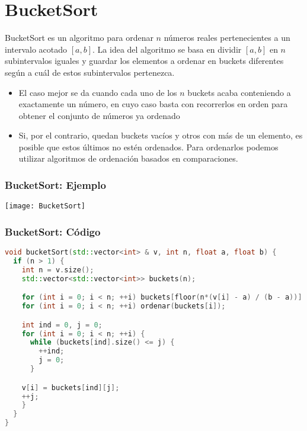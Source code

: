 \documentclass{beamer}
\begin{document}
\section{BucketSort}
\begin{frame}
 \alert{BucketSort} es un algoritmo para ordenar $n$ números reales pertenecientes a un intervalo acotado $[a,b]$.
 La idea del algoritmo se basa en dividir $[a,b]$ en $n$ subintervalos iguales y guardar los elementos a ordenar en \alert{buckets} diferentes según a cuál de estos subintervalos pertenezca.
 \begin{itemize}
 	\item El caso mejor se da cuando cada uno de los $n$ buckets acaba conteniendo a exactamente un número, en cuyo caso basta con recorrerlos en orden para obtener el conjunto de números ya ordenado
 	\item Si, por el contrario, quedan buckets vacíos y otros con más de un elemento, es posible que estos últimos no estén ordenados. Para ordenarlos podemos utilizar algoritmos de ordenación basados en comparaciones.
 \end{itemize}

\end{frame}

\begin{frame}
\frametitle{BucketSort: Ejemplo}
\texttt{[image: BucketSort]}
\end{frame}

\begin{frame}[fragile]
\frametitle{BucketSort: Código}
\begin{lstlisting}[language = C++, basicstyle=\ttfamily\scriptsize]
void bucketSort(std::vector<int> & v, int n, float a, float b) { 
  if (n > 1) {
    int n = v.size();
    std::vector<std::vector<int>> buckets(n);

    for (int i = 0; i < n; ++i) buckets[floor(n*(v[i] - a) / (b - a))].push_back(v[i]);
    for (int i = 0; i < n; ++i) ordenar(buckets[i]);

    int ind = 0, j = 0;
    for (int i = 0; i < n; ++i) {
      while (buckets[ind].size() <= j) {
        ++ind;
        j = 0;
      }

    v[i] = buckets[ind][j];
    ++j;
    }
  }
}
\end{lstlisting}
\end{frame}
\end{document}
